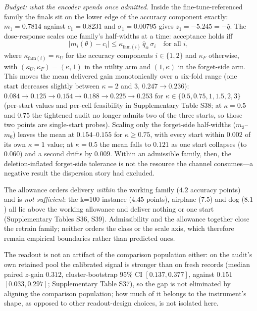\documentclass[lettersize,journal]{IEEEtran}
\begin{document}
\emph{Budget: what the encoder spends once admitted.} Inside
the fine-tune-referenced family the finals sit on the lower
edge of the accuracy component exactly: $m_1 = 0.7814$ against
$c_1 = 0.8231$ and $\sigma_1 = 0.00795$ gives
$z_1 = -5.245 = -\hat q$. The dose-response scales one
family's half-widths at a time: acceptance holds iff
\begin{equation}
\label{eq:dose}
|m_i(\theta) - c_i| \le
\kappa_{\mathrm{fam}(i)}\,\hat q_\alpha\,\sigma_i
\quad\text{for all } i,
\end{equation}
where $\kappa_{\mathrm{fam}(i)}{=}\kappa_U$ for the accuracy
components $i\in\{1,2\}$ and $\kappa_F$ otherwise, with
$(\kappa_U,\kappa_F)=(\kappa,1)$ in the utility arm and
$(1,\kappa)$ in the forget-side arm. This moves the mean
delivered gain monotonically over a
six-fold range (one start decreases slightly between
$\kappa{=}2$ and 3, $0.247\to0.236$):
$0.084 \to 0.125 \to 0.154 \to 0.188 \to 0.225 \to 0.253$ for
$\kappa \in \{0.5, 0.75, 1, 1.5, 2, 3\}$ (per-start values and
per-cell feasibility in Supplementary Table S38; at
$\kappa{=}0.5$ and $0.75$ the tightened audit no longer admits
two of the three starts, so those two points are single-start
probes). Scaling only the forget-side half-widths
($m_3$--$m_6$) leaves the mean at $0.154$--$0.155$ for
$\kappa \ge 0.75$, with every start within $0.002$ of its own
$\kappa{=}1$ value; at $\kappa{=}0.5$ the mean falls to $0.121$
as one start collapses (to $0.060$) and a second drifts by
$0.009$. Within an admissible family, then, the deletion-inflated forget-side
tolerance is not the resource the channel consumes---a
negative result the dispersion story had excluded.

The allowance orders delivery \emph{within} the working family
($4.2$ accuracy points) and is \emph{not sufficient}: the
k=100 instance ($4.45$ points), airplane ($7.5$) and dog
($8.1$) all lie above the working allowance and deliver nothing
or one start (Supplementary Tables S36, S39). Admissibility and the allowance together close the retrain
family; neither orders the class or the scale axis, which
therefore remain empirical boundaries rather than predicted
ones.

The readout is not an artifact of the comparison population
either: on the audit's own retained pool the calibrated signal
is stronger than on fresh records (median paired $z$-gain
$0.312$, cluster-bootstrap $95\%$ CI $[0.137, 0.377]$, against
$0.151$ $[0.033, 0.297]$; Supplementary Table S37), so the gap
is not eliminated by aligning the comparison population; how
much of it belongs to the instrument's shape, as opposed to
other readout-design choices, is not isolated here.
\end{document}
